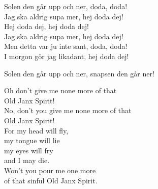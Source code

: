 \documentclass[a6paper,10pt]{article}
\begin{document}
\setlength{\oddsidemargin}{-0.37in}
\noindent
\begin{center}
\end{center}
\begin{lyrics}
Solen den går upp och ner, doda, doda! \\
Jag ska aldrig supa mer, hej doda dej! \\
Hej doda dej, hej doda dej! \\
Jag ska aldrig supa mer, hej doda dej! 
\vspace{5pt} \\
Men detta var ju inte sant, doda, doda! \\
I morgon gör jag likadant, hej doda dej! 
\end{lyrics}
\vspace{10pt}
\begin{center}
\end{center}
\begin{lyrics}
Solen den går upp och ner, snapsen den går ner!
\end{lyrics}
\vspace{25pt}
\begin{center}
\end{center}
\begin{lyrics}
Oh don't give me none more of that \\
Old Janx Spirit! \\
No, don't you give me none more of that \\
Old Janx Spirit! \\
For my head will fly, \\
my tongue will lie \\
my eyes will fry \\
and I may die. \\
Won't you pour me one more \\
of that sinful Old Janx Spirit. 
\end{lyrics}
\end{document}

